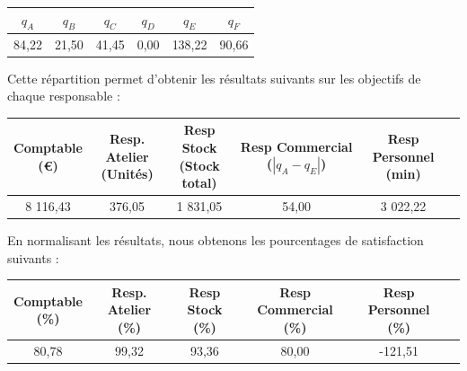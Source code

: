 \documentclass[paper=a4, fontsize=11pt]{report}
\numberwithin{equation}{section}		%
\numberwithin{figure}{section}			%
\numberwithin{table}{section}				%
\newcommand\abs[1]{\left|#1\right|}
\begin{document}
\begin{center}
\begin{tabular}{cccccc}
\hline
$q_A$ & $q_B$ & $q_C$ & $q_D$ & $q_E$ & $q_F$ \\
\hline
84,22 & 21,50 & 41,45 & 0,00 & 138,22 & 90,66 \\
\hline
\end{tabular}
\end{center}

Cette répartition permet d'obtenir les résultats suivants sur les objectifs de chaque responsable : 

\begin{table}[H]
\begin{center}
\begin{tabular}{c|ccccc}
\shortstack{Comptable \\ \scriptsize{(€)}} & \shortstack{Resp. Atelier \\ \scriptsize (Unités)} & \shortstack{Resp Stock \\ \scriptsize (Stock total)} & \shortstack{Resp Commercial \\ \scriptsize ($\abs{q_A - q_E}$)} &   \shortstack{Resp Personnel \\ \scriptsize (min)} \\ 
\hline 
8 116,43 & 376,05 & 1 831,05 & 54,00 & 3 022,22 \\ 
\end{tabular}
\end{center}
\end{table}

En normalisant les résultats, nous obtenons les pourcentages de satisfaction suivants : 

\begin{table}[H]
\begin{center}
\begin{tabular}{c|ccccc}
\shortstack{Comptable \\ \scriptsize{(\%)}} & \shortstack{Resp. Atelier \\ \scriptsize (\%)} & \shortstack{Resp Stock \\ \scriptsize (\%)} & \shortstack{Resp Commercial \\ \scriptsize (\%)} &   \shortstack{Resp Personnel \\ \scriptsize (\%)} \\ 
\hline 
80,78 & 99,32 & 93,36 & 80,00 & -121,51 \\
\end{tabular}
\end{center}
\end{table}
\end{document}
